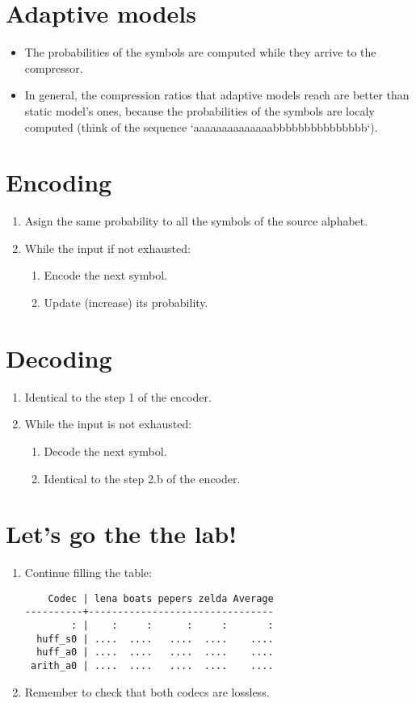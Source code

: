 \section{Adaptive models}
\begin{itemize}
\item The probabilities of the symbols are computed while they arrive to the compressor.
\item In general, the compression ratios that adaptive models reach are better than static model's ones, because the
  probabilities of the symbols are localy computed (think of the sequence `aaaaaaaaaaaaaabbbbbbbbbbbbbbb`).
\end{itemize}

\section{Encoding}
\begin{enumerate}
\item Asign the same probability to all the symbols of the source alphabet.
\item While the input if not exhausted:
  \begin{enumerate}
  \item Encode the next symbol.
  \item Update (increase) its probability.
  \end{enumerate}
\end{enumerate}

\section{Decoding}
\begin{enumerate}
\item Identical to the step 1 of the encoder.
\item While the input is not exhausted:
  \begin{enumerate}
  \item Decode the next symbol.
  \item Identical to the step 2.b of the encoder.
  \end{enumerate}
\end{enumerate}

\section*{Let's go the the lab!}
\begin{enumerate}
\item Continue filling the table:
\begin{verbatim}
    Codec | lena boats pepers zelda Average
----------+--------------------------------
        : |    :     :      :     :       :
  huff_s0 | ....  ....   ....  ....    ....
  huff_a0 | ....  ....   ....  ....    ....
 arith_a0 | ....  ....   ....  ....    ....
\end{verbatim}
\item Remember to check that both codecs are lossless.
\end{enumerate}

